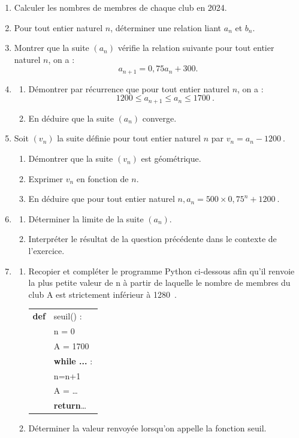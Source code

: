 \documentclass[10pt]{article}
\providecommand{\np}[2][]{{#2~#1}}
\begin{document}
\begin{enumerate}
\item Calculer les nombres de membres de chaque club en 2024.
\item Pour tout entier naturel $n$, déterminer une relation liant $a_{n}$ et $b_{n}$.
\item Montrer que la suite $\left(a_{n}\right)$ vérifie la relation suivante pour tout entier naturel $n$, on a : 
\[a_{n+1}= 0,75 a_{n} + 300.\]

\item 
	\begin{enumerate}
		\item Démontrer par récurrence que pour tout entier naturel $n$, on a :
\[1200 \leqslant a_{n+1} \leqslant a_{n} \leqslant \np{1700}.\]
		\item En déduire que la suite $\left(a_{n}\right)$ converge.
	\end{enumerate}
\item Soit $\left(v_{n}\right)$ la suite définie pour tout entier naturel $n$ par $v_{n}=a_{n}- \np{1200}$.
	\begin{enumerate}
		\item Démontrer que la suite $\left(v_{n}\right)$ est géométrique.
		\item Exprimer $v_{n}$ en fonction de $n$.
		\item En déduire que pour tout entier naturel $n, a_{n}= 500 \times 0,75^{n}+ \np{1200}$.
	\end{enumerate}
\item 
	\begin{enumerate}
		\item Déterminer la limite de la suite $\left(a_{n}\right)$.
		\item Interpréter le résultat de la question précédente dans le contexte de l'exercice.
	\end{enumerate}
\item 
	\begin{enumerate}
		\item Recopier et compléter le programme Python ci-dessous afin qu'il renvoie la plus petite valeur de n à partir de laquelle le nombre de membres du club A est strictement inférieur à \np{1280}.

\begin{center}
\begin{tabular}{l l}
\textbf{def}&seuil() :\\
&n = 0\\&A = \np{1700}\\
&\textbf{while ...} :\\
&\qquad n=n+1\\
&\qquad A = \ldots\\
&\textbf{return}\ldots\\
\end{tabular}

\end{center}
		\item Déterminer la valeur renvoyée lorsqu'on appelle la fonction seuil.
	\end{enumerate}
\end{enumerate}
\end{document}

